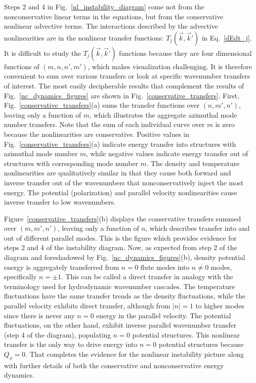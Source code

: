 \documentclass[showpacs,preprintnumbers,amsmath,amssymb,superscriptaddress,aip]{revtex4-1}
\begin{document}
Steps 2 and 4 in Fig.~\ref{nl_instability_diagram} come not from the nonconservative linear terms in the equations, but from the conservative nonlinear advective terms.
The interactions described by the advective nonlinearities are in the nonlinear transfer functions: $T_{j}(\vec{k},\vec{k}')$ in Eq.~\ref{dEdt_j}.
It is difficult to study the $T_{j}(\vec{k},\vec{k}')$ functions because they are four dimensional functions of $(m,n,n',m')$, 
which makes visualization challenging. It is therefore convenient to sum over various transfers or look at specific wavenumber transfers of interest. The most easily decipherable
results that complement the results of Fig.~\ref{nc_dynamics_figures} are shown in Fig.~\ref{conservative_transfers}. First, Fig.~\ref{conservative_transfers}(a) sums the transfer functions over
$(n,m',n')$, leaving only a function of $m$, which illustrates the aggregate azimuthal mode
number transfers. Note that the sum of each individual curve over $m$ is zero because the nonlinearities are conservative. Positive values in Fig.~\ref{conservative_transfers}(a)
indicate energy transfer into structures with azimuthal mode number $m$, while negative values indicate energy transfer out of structures with corresponding mode number $m$. 
The density and temperature nonlinearities
are qualitatively similar in that they cause both forward and inverse transfer out of the wavenumbers that nonconservatively inject the most energy. The potential (polarization) and parallel velocity 
nonlinearities cause inverse transfer to low wavenumbers. 

Figure~\ref{conservative_transfers}(b) displays the conservative transfers summed over $(m,m',n')$, leaving only a function of $n$, which describes transfer into and out
of different parallel modes. This is the figure which provides evidence for steps 2 and 4 of the instability diagram.
Now, as expected from step 2 of the diagram and foreshadowed by Fig.~\ref{nc_dynamics_figures}(b), 
density potential energy is aggregately transferred from $n=0$ flute modes into $n \ne 0$ modes, specifically $n = \pm 1$. This can be called a direct
transfer in analogy with the terminology used for hydrodynamic wavenumber cascades. The temperature fluctuations have the same transfer trends 
as the density fluctuations, while the parallel velocity exhibits direct transfer, although from $|n|=1$ to higher modes since there is never any $n=0$ energy in the parallel velocity.
The potential fluctuations, on the other hand, exhibit inverse parallel wavenumber transfer (step 4 of the diagram),
populating $n=0$ potential structures. This nonlinear transfer is the only way to drive energy into
$n=0$ potential structures because $Q_\phi=0$. That completes the evidence for the nonlinear instability picture along with further details of both the conservative and nonconservative energy dynamics.
\end{document}
